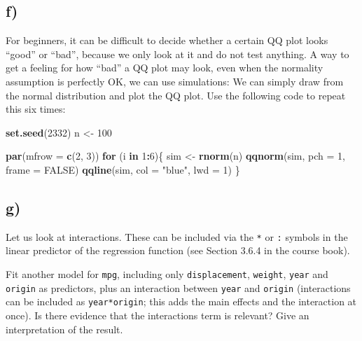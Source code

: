 \documentclass[
]{article}
\newenvironment{Shaded}{\begin{snugshade}}{\end{snugshade}}
\newcommand{\AttributeTok}[1]{\textcolor[rgb]{0.13,0.29,0.53}{#1}}
\newcommand{\ConstantTok}[1]{\textcolor[rgb]{0.56,0.35,0.01}{#1}}
\newcommand{\ControlFlowTok}[1]{\textcolor[rgb]{0.13,0.29,0.53}{\textbf{#1}}}
\newcommand{\DecValTok}[1]{\textcolor[rgb]{0.00,0.00,0.81}{#1}}
\newcommand{\FunctionTok}[1]{\textcolor[rgb]{0.13,0.29,0.53}{\textbf{#1}}}
\newcommand{\NormalTok}[1]{#1}
\newcommand{\OtherTok}[1]{\textcolor[rgb]{0.56,0.35,0.01}{#1}}
\newcommand{\SpecialCharTok}[1]{\textcolor[rgb]{0.81,0.36,0.00}{\textbf{#1}}}
\newcommand{\StringTok}[1]{\textcolor[rgb]{0.31,0.60,0.02}{#1}}
\begin{document}
\subsection{f)}\label{f}

For beginners, it can be difficult to decide whether a certain QQ plot
looks ``good'' or ``bad'', because we only look at it and do not test
anything. A way to get a feeling for how ``bad'' a QQ plot may look,
even when the normality assumption is perfectly OK, we can use
simulations: We can simply draw from the normal distribution and plot
the QQ plot. Use the following code to repeat this six times:

\begin{Shaded}
\begin{Highlighting}[]
\FunctionTok{set.seed}\NormalTok{(}\DecValTok{2332}\NormalTok{)}
\NormalTok{n }\OtherTok{\textless{}{-}} \DecValTok{100}

\FunctionTok{par}\NormalTok{(}\AttributeTok{mfrow =} \FunctionTok{c}\NormalTok{(}\DecValTok{2}\NormalTok{, }\DecValTok{3}\NormalTok{))}
\ControlFlowTok{for}\NormalTok{ (i }\ControlFlowTok{in} \DecValTok{1}\SpecialCharTok{:}\DecValTok{6}\NormalTok{)\{}
\NormalTok{  sim }\OtherTok{\textless{}{-}} \FunctionTok{rnorm}\NormalTok{(n)}
  \FunctionTok{qqnorm}\NormalTok{(sim, }\AttributeTok{pch =} \DecValTok{1}\NormalTok{, }\AttributeTok{frame =} \ConstantTok{FALSE}\NormalTok{)}
  \FunctionTok{qqline}\NormalTok{(sim, }\AttributeTok{col =} \StringTok{"blue"}\NormalTok{, }\AttributeTok{lwd =} \DecValTok{1}\NormalTok{)}
\NormalTok{\}}
\end{Highlighting}
\end{Shaded}

\subsection{g)}\label{g}

Let us look at interactions. These can be included via the \texttt{*} or
\texttt{:} symbols in the linear predictor of the regression function
(see Section 3.6.4 in the course book).

Fit another model for \texttt{mpg}, including only
\texttt{displacement}, \texttt{weight}, \texttt{year} and
\texttt{origin} as predictors, plus an interaction between \texttt{year}
and \texttt{origin} (interactions can be included as
\texttt{year*origin}; this adds the main effects and the interaction at
once). Is there evidence that the interactions term is relevant? Give an
interpretation of the result.
\end{document}
